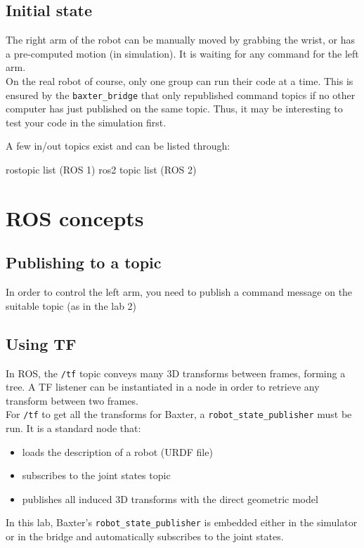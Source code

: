 \documentclass{ecnreport}
\begin{document}
\subsection{Initial state}

The right arm of the robot can be manually moved by grabbing the wrist, or has a pre-computed motion (in simulation). 
It is waiting for any command for the left arm.\\

On the real robot of course, only one group can run their code at a time. This is ensured by the \texttt{baxter\_bridge} that only republished command topics if no other computer has just published on the same topic. Thus, it may be interesting to test your code in the simulation first.

A few in/out topics exist and can be listed through:
\begin{bashcodelarge}
rostopic list (ROS 1)
ros2 topic list (ROS 2)
\end{bashcodelarge}


\section{ROS concepts}

\subsection{Publishing to a topic}

In order to control the left arm, you need to publish a command message on the suitable topic (as in the lab 2)

\subsection{Using TF}

In ROS, the \texttt{/tf} topic conveys many 3D transforms between frames, forming a tree. A TF listener can be instantiated in a node in order to retrieve any transform between two frames. \\

For \texttt{/tf} to get all the transforms for Baxter, a \texttt{robot\_state\_publisher} must be run. It is a standard node that:
\begin{itemize}
 \item loads the description of a robot (URDF file)
 \item subscribes to the joint states topic
 \item publishes all induced 3D transforms with the direct geometric model
\end{itemize}
In this lab, Baxter's \texttt{robot\_state\_publisher} is embedded either in the simulator or in the bridge and automatically subscribes to the joint states.
\end{document}
